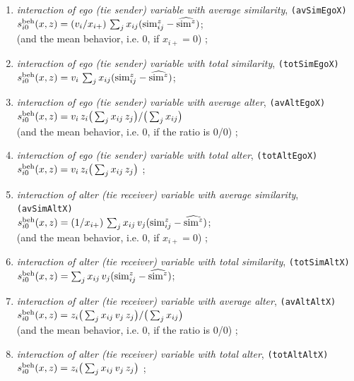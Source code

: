 \documentclass[a4paper,fleqn,11pt]{article}
\newcommand{\+}{\, + \,}
\newcommand{\vit}{\theenumi}
\newcounter{savenumi}
\begin{document}
\begin{enumerate}
\setcounter{enumi}{\value{savenumi}}
\item {\em interaction of ego (tie sender) variable with average similarity},
                       \texttt{(avSimEgoX)} \\
 $s^{\rm beh}_{i\vit}(x, z) = (v_i / x_{i+}) \,
         \sum_j x_{ij} ({\rm sim}^z_{ij} - \widehat{{\rm sim}^z}) $;\\
 (and the mean behavior, i.e. $0$, if $x_{i+} = 0$) ;
\item {\em interaction of ego (tie sender) variable with total similarity},
                       \texttt{(totSimEgoX)} \\
 $s^{\rm beh}_{i\vit}(x, z) = v_i \,
         \sum_j x_{ij} ({\rm sim}^z_{ij} - \widehat{{\rm sim}^z}) $;
\item {\em interaction of ego (tie sender) variable with average alter},
                       \texttt{(avAltEgoX)} \\
 $s^{\rm beh}_{i\vit}(x, z) =  v_i \, z_i \big( \sum_j x_{ij}\, z_j \big)
                                / \big (\sum_j x_{ij}\big)  $\\
 (and the mean behavior, i.e. $0$, if the ratio is 0/0) ;
\item {\em interaction of ego (tie sender) variable with total alter},
                       \texttt{(totAltEgoX)} \\
 $s^{\rm beh}_{i\vit}(x, z) =  v_i \, z_i \big( \sum_j x_{ij}\, z_j \big)   $ ;
\item {\em interaction of alter (tie receiver) variable with average similarity},
                       \texttt{(avSimAltX)} \\
 $s^{\rm beh}_{i\vit}(x, z) = (1 / x_{i+}) \,
         \sum_j x_{ij} \, v_j ({\rm sim}^z_{ij} - \widehat{{\rm sim}^z}) $;\\
 (and the mean behavior, i.e. $0$, if $x_{i+} = 0$) ;
\item {\em interaction of alter (tie receiver) variable with total similarity},
                       \texttt{(totSimAltX)} \\
 $s^{\rm beh}_{i\vit}(x, z) =
         \sum_j x_{ij} \, v_j ({\rm sim}^z_{ij} - \widehat{{\rm sim}^z}) $;
\item {\em interaction of alter (tie receiver) variable with average alter},
                       \texttt{(avAltAltX)} \\
 $s^{\rm beh}_{i\vit}(x, z) =  z_i \big( \sum_j x_{ij} \, v_j \, z_j \big)
                                / \big (\sum_j x_{ij}\big)  $\\
 (and the mean behavior, i.e. $0$, if the ratio is 0/0) ;
\item {\em interaction of alter (tie receiver) variable with total alter},
                       \texttt{(totAltAltX)} \\
 $s^{\rm beh}_{i\vit}(x, z) =  z_i \big( \sum_j x_{ij} \, v_j \, z_j \big) $ ;
\setcounter{savenumi}{\value{enumi}}
\end{enumerate}
\end{document}
